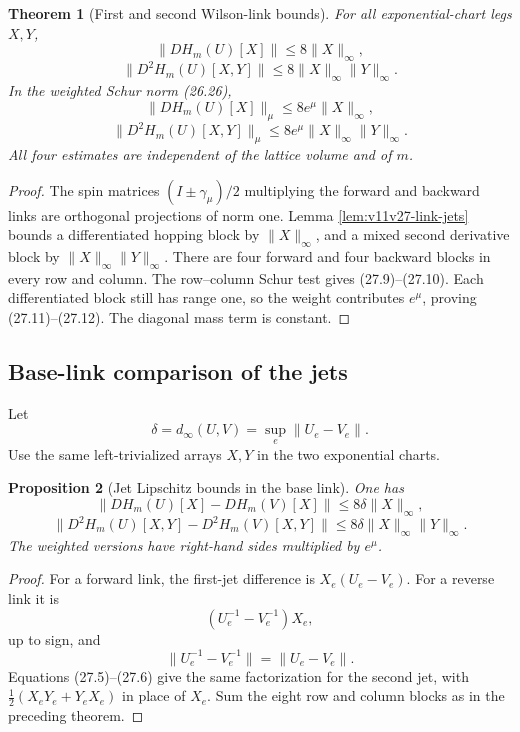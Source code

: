 \documentclass[11pt]{article}
\newtheorem{theorem}{Theorem}[section]
\newtheorem{proposition}[theorem]{Proposition}
\begin{document}
\begin{theorem}[First and second Wilson-link bounds]
\label{thm:v11v27-wilson-jets}
For all exponential-chart legs \(X,Y\),
\[
 \|D H_m(U)[X]\|
 \leq8\|X\|_\infty,
 \tag{27.9}
\]
\[
 \|D^2H_m(U)[X,Y]\|
 \leq8\|X\|_\infty\|Y\|_\infty.
 \tag{27.10}
\]
In the weighted Schur norm (26.26),
\[
 \|D H_m(U)[X]\|_\mu
 \leq8e^\mu\|X\|_\infty,
 \tag{27.11}
\]
\[
 \|D^2H_m(U)[X,Y]\|_\mu
 \leq8e^\mu\|X\|_\infty\|Y\|_\infty.
 \tag{27.12}
\]
All four estimates are independent of the lattice volume and of \(m\).
\end{theorem}

\begin{proof}
The spin matrices \((I\pm\gamma_\mu)/2\) multiplying the forward and
backward links are orthogonal projections of norm one.  Lemma
\ref{lem:v11v27-link-jets} bounds a differentiated hopping block by
\(\|X\|_\infty\), and a mixed second derivative block by
\(\|X\|_\infty\|Y\|_\infty\).  There are four forward and four backward
blocks in every row and column.  The row--column Schur test gives
(27.9)--(27.10).  Each differentiated block still has range one, so the
weight contributes \(e^\mu\), proving (27.11)--(27.12).
The diagonal mass term is constant.
\end{proof}

\subsection{Base-link comparison of the jets}

Let
\[
 \delta=d_\infty(U,V)
 =\sup_e\|U_e-V_e\|.
 \tag{27.13}
\]
Use the same left-trivialized arrays \(X,Y\) in the two exponential
charts.

\begin{proposition}[Jet Lipschitz bounds in the base link]
\label{prop:v11v27-jet-lipschitz}
One has
\[
 \|D H_m(U)[X]-D H_m(V)[X]\|
 \leq8\delta\|X\|_\infty,
 \tag{27.14}
\]
\[
 \|D^2H_m(U)[X,Y]-D^2H_m(V)[X,Y]\|
 \leq8\delta\|X\|_\infty\|Y\|_\infty.
 \tag{27.15}
\]
The weighted versions have right-hand sides multiplied by \(e^\mu\).
\end{proposition}

\begin{proof}
For a forward link, the first-jet difference is
\(X_e(U_e-V_e)\).  For a reverse link it is
\[
 (U_e^{-1}-V_e^{-1})X_e,
\]
up to sign, and
\[
 \|U_e^{-1}-V_e^{-1}\|=\|U_e-V_e\|.
\]
Equations (27.5)--(27.6) give the same factorization for the second jet,
with \(\frac12(X_eY_e+Y_eX_e)\) in place of \(X_e\).
Sum the eight row and column blocks as in the preceding theorem.
\end{proof}
\end{document}

